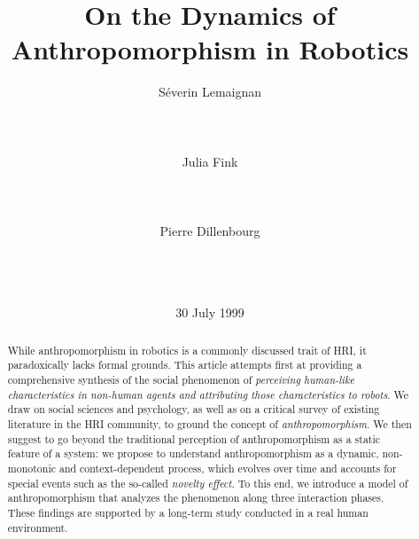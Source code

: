 \documentclass{acm_proc_article-sp}
\begin{document}
\title{On the Dynamics of Anthropomorphism in Robotics
}

\author{
\alignauthor
Séverin Lemaignan\\
    \\
    \\
    \\
\alignauthor
Julia Fink\\
    \\
    \\
    \\
\alignauthor
Pierre Dillenbourg\\
    \\
    \\
    \\
}
\date{30 July 1999}

\maketitle

\begin{abstract}

While anthropomorphism in robotics is a commonly discussed trait of
HRI, it paradoxically lacks formal grounds. This article
attempts first at providing a comprehensive synthesis of the social
phenomenon of \textit{perceiving human-like characteristics in non-human
agents and attributing those characteristics to robots}. We draw on
social sciences and psychology, as well as on a critical survey of
existing literature in the HRI community, to ground the concept of
\textit{anthropomorphism}. We then suggest to go beyond the traditional
perception of anthropomorphism as a static feature of a system: we propose to
understand anthropomorphism as a dynamic, non-monotonic and
context-dependent process, which evolves over time and accounts for
special events such as the so-called \textit{novelty effect}. To this end,
we introduce a model of anthropomorphism that analyzes the phenomenon
along three interaction phases. These findings are supported by a long-term
study conducted in a real human environment.
\end{abstract}
\end{document}
